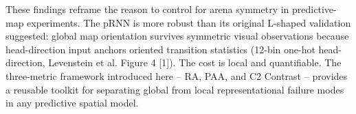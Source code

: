 ﻿\documentclass[10pt]{article}
\begin{document}
These findings reframe the reason to control for arena symmetry in predictive-map experiments. The pRNN is more robust than its original L-shaped validation suggested: global map orientation survives symmetric visual observations because head-direction input anchors oriented transition statistics (12-bin one-hot head-direction, Levenstein et al. Figure 4 [1]). The cost is local and quantifiable. The three-metric framework introduced here -- RA, PAA, and C2 Contrast -- provides a reusable toolkit for separating global from local representational failure modes in any predictive spatial model.



\end{document}
